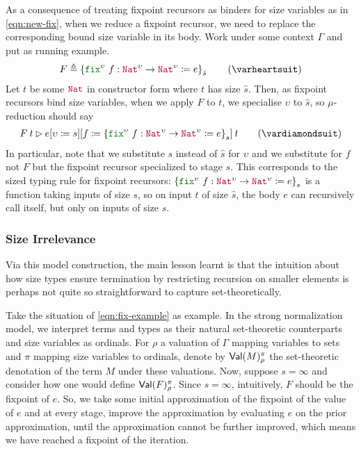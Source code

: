 As a consequence of treating fixpoint recursors as binders for size
variables as in \eqref{eqn:new-fix}, when we reduce a fixpoint
recursor, we need to replace the corresponding bound size variable in
its body.
%
Work under some context $\Gamma$ and put as running example.
%
\begin{align*}
  F \triangleq \left\{\kw{fix}^\upsilon ~ f : \Nat^\upsilon \to \Nat^\upsilon \coloneqq e\right\}_{\hat{s}}
  \label{eqn:fix-example}\tag{$\varheartsuit$}
\end{align*}
%
Let $t$ be some $\Nat$ in constructor form where $t$ has size
$\hat{s}$.
%
Then, as fixpoint recursors bind size variables, when we apply $F$ to
$t$, we specialise $\upsilon$ to $\hat{s}$, so $\mu$-reduction should
say
%
\begin{align*}
  \app{F}{t} \rhd \app{\subst{\subst{e}{\upsilon}{s}}{f}{
  \left\{\kw{fix}^\upsilon ~ f : \Nat^\upsilon \to \Nat^\upsilon \coloneqq e\right\}_{s}
  }}{t}
  \label{eqn:mu-example}\tag{$\vardiamondsuit$}
\end{align*}
%
In particular, note that we substitute $s$ instead of $\hat{s}$ for
$\upsilon$ and we substitute for $f$ not $F$ but the fixpoint recursor
specialized to stage $s$.
%
This corresponds to the sized typing rule for fixpoint recursors:
$\left\{\kw{fix}^\upsilon ~ f : \Nat^\upsilon \to \Nat^\upsilon
  \coloneqq e\right\}_{s}$ is a function taking inputs of size $s$, so
on input $t$ of size $\hat{s}$, the body $e$ can recursively call
itself, but only on inputs of size $s$.

\subsubsection{Size Irrelevance}
%
Via this model construction, the main lesson learnt is
that the intuition about how size types ensure termination by
restricting recursion on smaller elements is perhaps not quite so
straightforward to capture set-theoretically.

Take the situation of \eqref{eqn:fix-example} as example.
%
In the strong normalization model, we interpret terms and types as
their natural set-theoretic counterparts and size variables as
ordinals.
%
For $\rho$ a valuation of $\Gamma$ mapping variables to sets and $\pi$
mapping size variables to ordinals, denote by $\textsf{Val}(M)_\rho^\pi$ the
set-theoretic denotation of the term $M$ under these valuations.
%
Now, suppose $s=\infty$ and consider how one would define
$\textsf{Val}(F)_\rho^\pi$.
%
Since $s=\infty$, intuitively, $F$ should be the fixpoint of $e$.
%
So, we take some initial approximation of the fixpoint of the value of
$e$ and at every stage, improve the approximation by evaluating $e$ on
the prior approximation, until the approximation cannot be further
improved, which means we have reached a fixpoint of the iteration.

